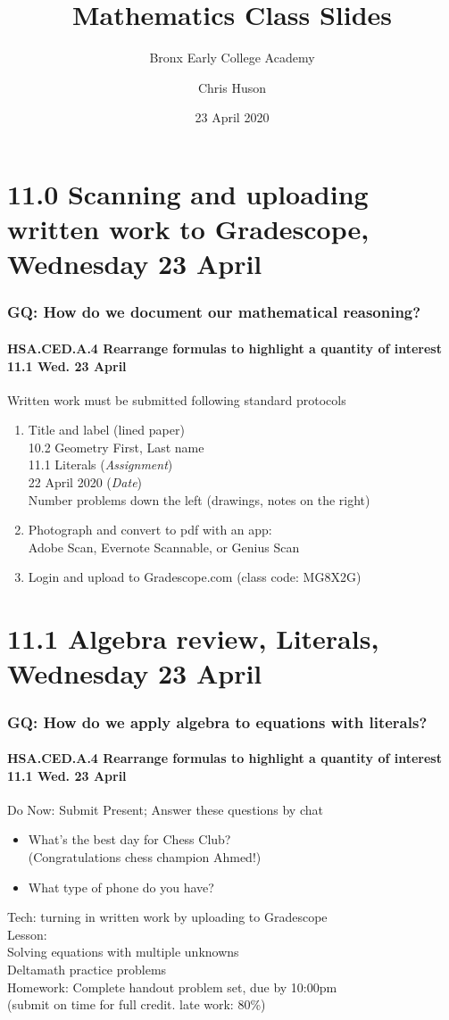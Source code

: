 \documentclass{beamer}
\title{Mathematics Class Slides}
\subtitle{Bronx Early College Academy}
\author{Chris Huson}
\date{23 April 2020}
\begin{document}
\frame{\titlepage}
\section[Outline]{}
\frame{\tableofcontents}

\section{11.0 Scanning and uploading written work to Gradescope, Wednesday 23 April} 
\frame
{
  \frametitle{GQ: How do we document our mathematical reasoning?}
  \framesubtitle{HSA.CED.A.4 Rearrange formulas to highlight a quantity of interest \hfill \alert{11.1 Wed. 23 April}}

  Written work must be submitted following standard protocols
  
  \begin{enumerate}
      \item Title and label (lined paper) \\[0.25cm]
      10.2 Geometry \hfill First, Last name \\
      11.1 Literals (\emph{Assignment})\\
      22 April 2020 (\emph{Date}) \\[0.25cm]
      Number problems down the left (drawings, notes on the right)
      \item Photograph and convert to pdf with an app: \\
      \quad Adobe Scan, Evernote Scannable, or Genius Scan
      \item Login and upload to Gradescope.com (class code: \alert{MG8X2G})
    \end{enumerate}
}

\section{11.1 Algebra review, Literals, Wednesday 23 April} 
\frame
{
  \frametitle{GQ: How do we apply algebra to equations with literals?}
  \framesubtitle{HSA.CED.A.4 Rearrange formulas to highlight a quantity of interest \hfill \alert{11.1 Wed. 23 April}}

  \begin{block}{Do Now: Submit Present; Answer these questions by chat}
    \begin{itemize}
      \item What's the best day for Chess Club? \\
      (Congratulations chess champion Ahmed!)
      \item What type of phone do you have? 
    \end{itemize}

    \end{block}
    Tech: turning in written work by uploading to Gradescope \\[0.25cm]
    Lesson: \\
    Solving equations with multiple unknowns\\
    Deltamath practice problems \\[0.25cm]
    Homework: Complete handout problem set, due by 10:00pm \\
    (submit on time for full credit. late work: 80\%)
}
\end{document}
